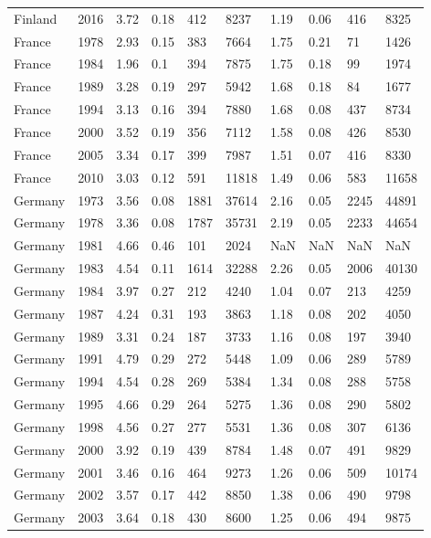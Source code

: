 \begin{tabular}{llllllllll}
Finland & 2016 & 3.72 & 0.18 & 412 & 8237 & 1.19 & 0.06 & 416 & 8325 \\ 
France & 1978 & 2.93 & 0.15 & 383 & 7664 & 1.75 & 0.21 & 71 & 1426 \\ 
France & 1984 & 1.96 & 0.1 & 394 & 7875 & 1.75 & 0.18 & 99 & 1974 \\ 
France & 1989 & 3.28 & 0.19 & 297 & 5942 & 1.68 & 0.18 & 84 & 1677 \\ 
France & 1994 & 3.13 & 0.16 & 394 & 7880 & 1.68 & 0.08 & 437 & 8734 \\ 
France & 2000 & 3.52 & 0.19 & 356 & 7112 & 1.58 & 0.08 & 426 & 8530 \\ 
France & 2005 & 3.34 & 0.17 & 399 & 7987 & 1.51 & 0.07 & 416 & 8330 \\ 
France & 2010 & 3.03 & 0.12 & 591 & 11818 & 1.49 & 0.06 & 583 & 11658 \\ 
Germany & 1973 & 3.56 & 0.08 & 1881 & 37614 & 2.16 & 0.05 & 2245 & 44891 \\ 
Germany & 1978 & 3.36 & 0.08 & 1787 & 35731 & 2.19 & 0.05 & 2233 & 44654 \\ 
Germany & 1981 & 4.66 & 0.46 & 101 & 2024 & NaN & NaN & NaN & NaN \\ 
Germany & 1983 & 4.54 & 0.11 & 1614 & 32288 & 2.26 & 0.05 & 2006 & 40130 \\ 
Germany & 1984 & 3.97 & 0.27 & 212 & 4240 & 1.04 & 0.07 & 213 & 4259 \\ 
Germany & 1987 & 4.24 & 0.31 & 193 & 3863 & 1.18 & 0.08 & 202 & 4050 \\ 
Germany & 1989 & 3.31 & 0.24 & 187 & 3733 & 1.16 & 0.08 & 197 & 3940 \\ 
Germany & 1991 & 4.79 & 0.29 & 272 & 5448 & 1.09 & 0.06 & 289 & 5789 \\ 
Germany & 1994 & 4.54 & 0.28 & 269 & 5384 & 1.34 & 0.08 & 288 & 5758 \\ 
Germany & 1995 & 4.66 & 0.29 & 264 & 5275 & 1.36 & 0.08 & 290 & 5802 \\ 
Germany & 1998 & 4.56 & 0.27 & 277 & 5531 & 1.36 & 0.08 & 307 & 6136 \\ 
Germany & 2000 & 3.92 & 0.19 & 439 & 8784 & 1.48 & 0.07 & 491 & 9829 \\ 
Germany & 2001 & 3.46 & 0.16 & 464 & 9273 & 1.26 & 0.06 & 509 & 10174 \\ 
Germany & 2002 & 3.57 & 0.17 & 442 & 8850 & 1.38 & 0.06 & 490 & 9798 \\ 
Germany & 2003 & 3.64 & 0.18 & 430 & 8600 & 1.25 & 0.06 & 494 & 9875 \\ 

\end{tabular}
